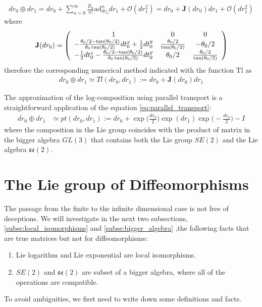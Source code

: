 \begin{align}
dr_{0}\oplus dr_{1}
=
dr_{0}
+
\sum_{n=0}^{\infty} \frac{B_{n}}{n!} \text{ad}_{dr_{0}}^{ n} 
dr_{1}
+
\mathcal{O}(dr_{1}^2)
=
dr_{0}
+
\mathbf{J}(dr_{0})
dr_{1}
+
\mathcal{O}(dr_{1}^2)
\end{align}
where 
\begin{align*}
\mathbf{J}(dr_{0})
=
\left (
\begin{array} {c c c}
1            &  0        &      0
\\
-\frac{\theta_0/2 - \tan(\theta_0/2)}{\theta_0\tan(\theta_0/2)}  dt^{x}_0 + \frac{1}{2}dt^{y}_0       
&  \frac{\theta_0 /2}{\tan(\theta_0/2)} 
& - \theta_0/2 
\\
-  \frac{1}{2} dt^{x}_0 -\frac{\theta_0/2 - \tan(\theta_0/2)}{\theta_0\tan(\theta_0/2)} dt^{y}_0       
& \theta_0/2 
&  \frac{\theta_0 /2}{\tan(\theta_0/2)}
\end{array}
\right )
\end{align*}
therefore the corresponding numerical method indicated with the function $\text{Tl}$ as
\begin{align}\label{eq:taylor_se2}
dr_{0}\oplus dr_{1}
\simeq
Tl(dr_{0}, dr_{1})
:=
dr_{0}
+
\mathbf{J}(dr_{0})
dr_{1}
\end{align}

The approximation of the log-composition using parallel transport is a straightforward application of the equation \ref{eq:parallel_transport}: 
\begin{align}\label{eq:parallel_transport_se2}
dr_{0}\oplus dr_{1}
&\simeq
pt(dr_{0}, dr_{1}) 
:=
dr_{0}
+
\exp\big(\frac{dr_{0}}{2}\big)   
\exp(dr_{1}) 
\exp\big(-\frac{dr_{0}}{2}\big)
-
I
\end{align}
where the composition in the Lie group coincides with the product of matrix in the bigger algebra $GL(3)$ that contains both the Lie group $SE(2)$ and the Lie algebra $\mathfrak{se}(2)$.


\section{The Lie group of Diffeomorphisms}\label{se:svf}


The passage from the finite to the infinite dimensional case is not free of deceptions. We will investigate in the next two subsections, \ref{subse:local_isomorphisms} and \ref{subse:bigger_algebra} ,the following facts that are true matrices but not for diffeomorphisms:
\begin{enumerate}
	\item Lie logarithm and Lie exponential are local isomorphisms.
	\item $SE(2)$ and $\mathfrak{se}(2)$ are subset of a bigger algebra, where all of the operations are compatible.
\end{enumerate}
To avoid ambiguities, we first need to write down some definitions and facts.

